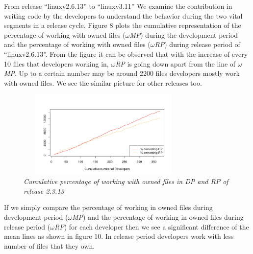 \documentclass{acm_proc_article-sp}
\begin{document}
From release ``linuxv2.6.13'' to ``linuxv3.11'' We examine the contribution in writing code by the developers to understand the behavior during the two vital segments in a release cycle. Figure 8 plots the cumulative representation of the percentage of working with owned files ($\omega$\textit{MP}) during the development period and the percentage of working with owned files ($\omega$\textit{RP}) during release period of ``linuxv2.6.13''. From the figure it can be observed that with the increase of every 10 files that developers working in, $\omega$\textit{RP} is going down apart from the line of $\omega$\textit{MP}. Up to a certain number may be around 2200 files developers mostly work with owned files. We see the similar picture for other releases too.
\begin{figure}
\begin{center}
\includegraphics[height=1.7in,width=3.4in]{cumulFileOwnP.png}
\caption{\small \sl Cumulative percentage of working with owned files in DP and RP of release 2.3.13}
\end{center}
\end{figure}

If we simply compare the percentage of working in owned files during development period ($\omega$\textit{MP}) and the percentage of working in owned files during release period ($\omega$\textit{RP}) for each developer then we see a significant difference of the mean lines as shown in figure 10. In release period developers work with less number of files that they own.
\end{document}
